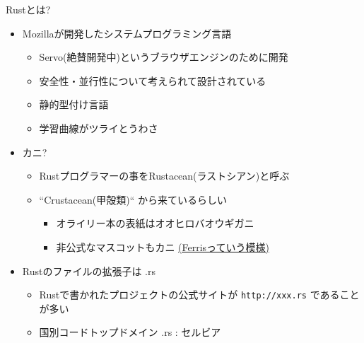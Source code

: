 \documentclass[cjk,dvipdfmx,10pt,compress,fragile%
hyperref={bookmarks=true,bookmarksnumbered=true,bookmarksopen=false,%
colorlinks=false,%
pdftitle={第 134 回 関西 Debian 勉強会},%
pdfauthor={小林},%
pdfsubject={資料},%
}]{beamer}
\begin{document}
\begin{frame}[t,fragile]{Rustとは?}
 \begin{itemize}
  \item Mozillaが開発したシステムプログラミング言語
	\begin{itemize}
	 \item Servo(絶賛開発中)というブラウザエンジンのために開発
	 \item 安全性・並行性について考えられて設計されている
	 \item 静的型付け言語
	 \item 学習曲線がツライとうわさ
	\end{itemize}
  \item カニ?
	\begin{itemize}
	 \item Rustプログラマーの事をRustacean(ラストシアン)と呼ぶ
	 \item ``Crustacean(甲殻類)`` から来ているらしい
	       \begin{itemize}
		\item オライリー本の表紙はオオヒロバオウギガニ
		\item 非公式なマスコットもカニ \href{http://rustacean.net/}{(Ferrisっていう模様)}
	       \end{itemize}
	\end{itemize}
  \item Rustのファイルの拡張子は .rs
	\begin{itemize}
	 \item Rustで書かれたプロジェクトの公式サイトが \verb|http://xxx.rs| であることが多い
	 \item 国別コードトップドメイン .rs : セルビア
	\end{itemize}
 \end{itemize}
\end{frame}
\end{document}
